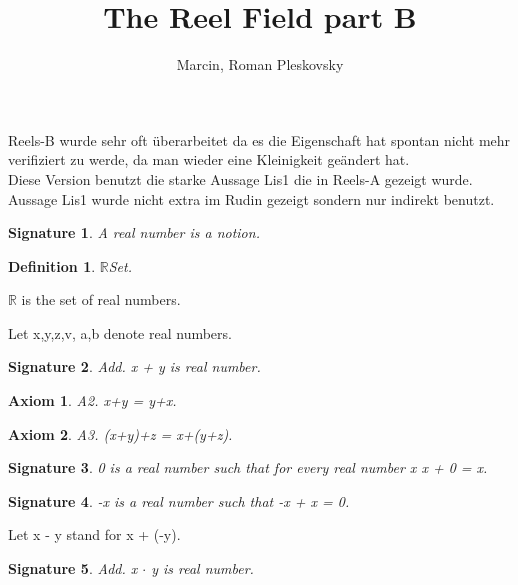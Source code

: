 \documentclass{article}
\newenvironment{forthel}{\begin{leftbar}}{\end{leftbar}}
\newtheorem{axiom}{Axiom}
\newtheorem{definition}{Definition}
\newtheorem{signature}{Signature}
\begin{document}
\title{The Reel Field part B}
\author{Marcin, Roman Pleskovsky}
\maketitle

Reels-B wurde sehr oft überarbeitet da es die Eigenschaft hat spontan nicht mehr verifiziert zu werde, da man wieder eine Kleinigkeit ge\"andert hat.\\

Diese Version benutzt die starke Aussage Lis1 die in Reels-A gezeigt wurde.\\
Aussage Lis1 wurde nicht extra im Rudin gezeigt sondern nur indirekt benutzt.\\

\begin{forthel}
[set/-s] [element/-s] [number/-s] [integer/-s]

\begin{signature} A real number is a notion.

\end{signature}

\begin{definition} $\mathbb{R}$Set.

\end{definition}
$\mathbb{R}$ is the set of real numbers.

Let x,y,z,v, a,b denote real numbers.



\begin{signature} Add. x + y is real number.

\end{signature}
\begin{axiom} A2. x+y = y+x.

\end{axiom}
\begin{axiom} A3. (x+y)+z = x+(y+z).

\end{axiom}
\begin{signature} 0 is a real number such that for every real number x x + 0 = x.

\end{signature}
\begin{signature} -x is a real number such that -x + x = 0.

\end{signature}

Let x - y stand for x + (-y).

\begin{signature} Add. x $\cdot$ y is real number.


\end{signature}
\end{forthel}
\end{document}
